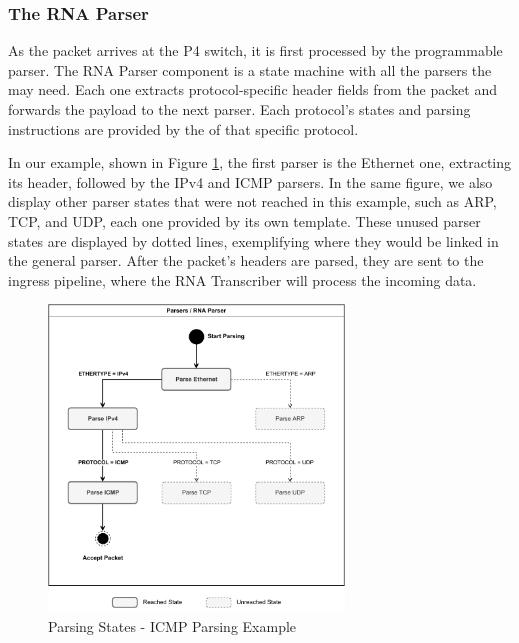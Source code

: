 \subsubsection*{The RNA Parser}

As the packet arrives at the P4 switch, it is first processed by the programmable parser. The RNA Parser component is a state machine with all the parsers the \Offloaders{} may need. Each one extracts protocol-specific header fields from the packet and forwards the payload to the next parser. Each protocol's states and parsing instructions are provided by the \ProtocolTemplate{} of that specific protocol.

In our example, shown in Figure \ref{fig:icmp_ex_parser}, the first parser is the Ethernet one, extracting its header, followed by the IPv4 and ICMP parsers. In the same figure, we also display other parser states that were not reached in this example, such as ARP, TCP, and UDP, each one provided by its own template. These unused parser states are displayed by dotted lines, exemplifying where they would be linked in the general parser. After the packet's headers are parsed, they are sent to the ingress pipeline, where the RNA Transcriber will process the incoming data.

\begin{figure}[ht]
    \caption{Parsing States - ICMP Parsing Example}
    \begin{center}
        \includegraphics[width=0.7\textwidth]{images/icmp_ex_parser.pdf}  
    \end{center}
    \label{fig:icmp_ex_parser}
\end{figure}

